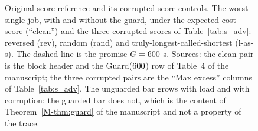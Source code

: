 \begin{figure}[htbp]
{}
\caption{Original-score reference and its corrupted-score controls. The worst single job, with and without the guard, under the
expected-cost score (``clean'') and the three corrupted scores of
Table~\ref{tab:s_adv}: reversed (rev), random (rand) and truly-longest-called-shortest
(l-as-s). The dashed line is the promise $G = 600$ s. Sources: the clean
pair is the block header and the Guard($600$) row of
Table~4 of the manuscript; the three corrupted pairs are the ``Max excess'' columns
of Table~\ref{tab:s_adv}. The unguarded bar grows with load and with corruption;
the guarded bar does not, which is the content of Theorem~\ref*{M-thm:guard} of the manuscript and
not a property of the trace.}
\label{fig:excess}
\end{figure}
